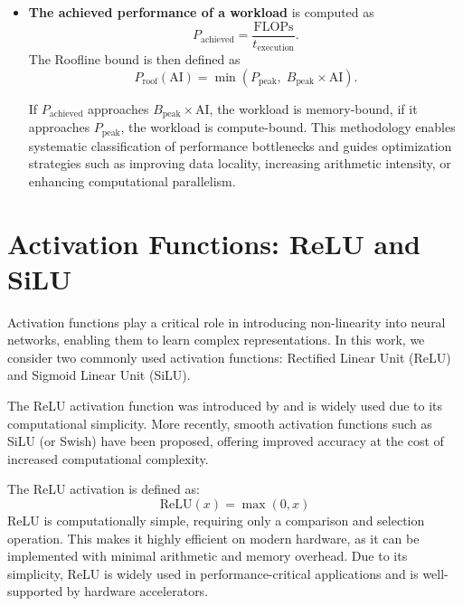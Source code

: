 \documentclass[12pt,a4paper]{report}
\begin{document}
\begin{itemize}
\begin{equation}
        \end{equation}
        This estimate ignores cache reuse and intermediate buffering, thereby providing an upper bound on
        arithmetic intensity.
        \item \textbf{The achieved performance of a workload} is computed as
        \begin{equation}
        P_{\mathrm{achieved}} = \frac{\mathrm{FLOPs}}{t_{\mathrm{execution}}}.
        \end{equation}
        The Roofline bound is then defined as
        \begin{equation}
        P_{\mathrm{roof}}(\mathrm{AI}) =
        \min \left( P_{\mathrm{peak}}, \; B_{\mathrm{peak}} \times \mathrm{AI} \right).
        \end{equation}

        If $P_{\mathrm{achieved}}$ approaches $B_{\mathrm{peak}} \times \mathrm{AI}$, the workload
        is memory-bound, if it approaches $P_{\mathrm{peak}}$, the workload is compute-bound.
        This methodology enables systematic classification of performance bottlenecks and guides
        optimization strategies such as improving data locality, increasing arithmetic intensity, or enhancing
        computational parallelism.
    \end{itemize}

\section{Activation Functions: ReLU and SiLU}

Activation functions play a critical role in introducing non-linearity into neural networks, enabling them to learn
complex representations. In this work, we consider two commonly used activation functions: Rectified Linear
Unit (ReLU) and Sigmoid Linear Unit (SiLU).

The ReLU activation function was introduced by \cite{nair2010relu} and is widely used due to its computational simplicity.
More recently, smooth activation functions such as SiLU (or Swish) \cite{ramachandran2017swish}
have been proposed, offering improved accuracy at the cost of increased computational complexity.

The ReLU activation is defined as:
\begin{equation}
\text{ReLU}(x) = \max(0, x)
\end{equation}
ReLU is computationally simple, requiring only a comparison and selection operation. This makes it highly efficient
on modern hardware, as it can be implemented with minimal arithmetic and memory overhead. Due to its simplicity,
ReLU is widely used in performance-critical applications and is well-supported by hardware accelerators.
\end{document}
